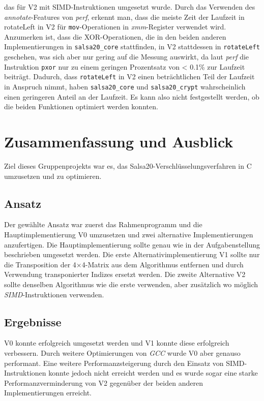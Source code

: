 \documentclass[course=erap]{aspdoc}
\begin{document}
das für V2 mit SIMD-Instruktionen umgesetzt wurde. Durch das Verwenden des \emph{annotate}-Features von 
\emph{perf}, erkennt man, dass die meiste Zeit der Laufzeit in rotateLeft in V2 für \texttt{mov}-Operationen in 
\emph{xmm}-Register verwendet wird. Anzumerken ist, dass die XOR-Operationen, die in den beiden anderen Implementierungen
in \texttt{salsa20\_core} stattfinden, in V2 stattdessen in \texttt{rotateLeft} geschehen, was sich aber nur gering 
auf die Messung auswirkt, da laut \emph{perf} die Instruktion \texttt{pxor} nur zu einem geringen 
Prozentsatz von < 0.1\% zur Laufzeit beiträgt.
Dadurch, dass \texttt{rotateLeft} in V2 einen beträchtlichen Teil der Laufzeit in Anspruch nimmt,
haben \texttt{salsa20\_core} und \texttt{salsa20\_crypt} wahrscheinlich einen geringeren Anteil an der Laufzeit. Es kann 
also nicht festgestellt werden, ob die beiden Funktionen optimiert werden konnten.


\section{Zusammenfassung und Ausblick}
Ziel dieses Gruppenprojekts war es, das Salsa20-Verschlüsselungsverfahren in C um\-zu\-setzen und zu optimieren.

\subsection{Ansatz}
Der gewählte Ansatz war zuerst das Rahmenprogramm und die Haupt\-implemen\-tierung V0 umzusetzen 
und zwei alternative Implementierungen anzufertigen. Die Haupt\-implemen\-tierung sollte genau wie 
in der Aufgabenstellung beschrieben umgesetzt werden.
Die erste Alternativimplementierung V1 sollte nur die Transposition der 4$\times$4-Matrix aus 
dem Algorithmus entfernen und durch Verwendung transponierter Indizes ersetzt werden. Die zweite Alternative V2
sollte denselben Algorithmus wie die erste verwenden, aber zusätzlich wo möglich \emph{SIMD}-Instruktionen verwenden.

\subsection{Ergebnisse}
V0 konnte erfolgreich umgesetzt werden und V1 konnte 
diese erfolgreich verbessern. Durch weitere Optimierungen von \emph{GCC} wurde V0 aber
genauso performant.
Eine weitere Performanzsteigerung durch den Einsatz von SIMD-Instruktionen konnte jedoch nicht erreicht werden
und es wurde sogar eine starke Performanzverminderung von V2 gegenüber der beiden anderen Implementierungen erreicht.
\end{document}
